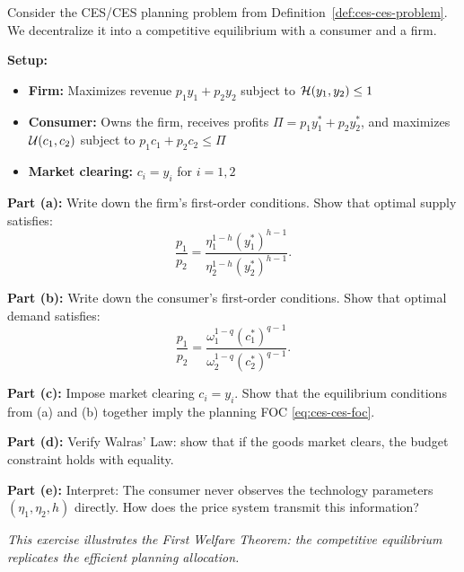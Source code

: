 \begin{tcolorbox}[
    enhanced, breakable,
    colback=gray!5, colframe=gray!50!black,
    title={\textbf{Exercise: Decentralization}},
    fonttitle=\bfseries,
    label={ex:decentralization}
]
Consider the CES/CES planning problem from Definition~\ref{def:ces-ces-problem}. We decentralize it into a competitive equilibrium with a consumer and a firm.

\textbf{Setup:}
\begin{itemize}[leftmargin=*]
    \item \textbf{Firm:} Maximizes revenue $p_1 y_1 + p_2 y_2$ subject to $\mathcal{H}(y_1, y_2) \leq 1$
    \item \textbf{Consumer:} Owns the firm, receives profits $\Pi = p_1 y_1^\ast + p_2 y_2^\ast$, and maximizes $\mathcal{U}(c_1, c_2)$ subject to $p_1 c_1 + p_2 c_2 \leq \Pi$
    \item \textbf{Market clearing:} $c_i = y_i$ for $i = 1, 2$
\end{itemize}

\textbf{Part (a):} Write down the firm's first-order conditions. Show that optimal supply satisfies:
\begin{equation*}
\frac{p_1}{p_2} = \frac{\eta_1^{1-h} (y_1^\ast)^{h-1}}{\eta_2^{1-h} (y_2^\ast)^{h-1}}.
\end{equation*}

\textbf{Part (b):} Write down the consumer's first-order conditions. Show that optimal demand satisfies:
\begin{equation*}
\frac{p_1}{p_2} = \frac{\omega_1^{1-q} (c_1^\ast)^{q-1}}{\omega_2^{1-q} (c_2^\ast)^{q-1}}.
\end{equation*}

\textbf{Part (c):} Impose market clearing $c_i = y_i$. Show that the equilibrium conditions from (a) and (b) together imply the planning FOC \eqref{eq:ces-ces-foc}.

\textbf{Part (d):} Verify Walras' Law: show that if the goods market clears, the budget constraint holds with equality.

\textbf{Part (e):} Interpret: The consumer never observes the technology parameters $(\eta_1, \eta_2, h)$ directly. How does the price system transmit this information?

\medskip
\emph{This exercise illustrates the First Welfare Theorem: the competitive equilibrium replicates the efficient planning allocation.}
\end{tcolorbox}

